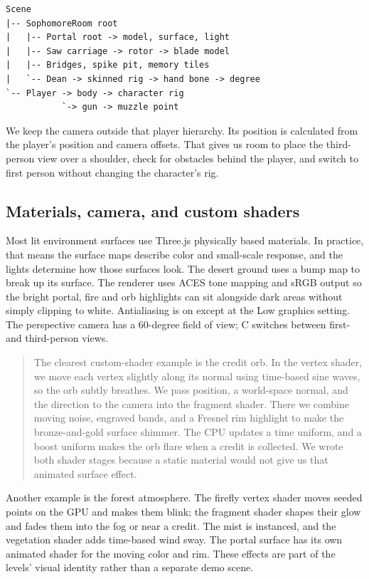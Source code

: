 \documentclass[11pt,a4paper]{article}
\newcommand{\say}[1]{\begin{quote}\small\color{ink}#1\end{quote}}
\begin{document}
\begin{verbatim}
Scene
|-- SophomoreRoom root
|   |-- Portal root -> model, surface, light
|   |-- Saw carriage -> rotor -> blade model
|   |-- Bridges, spike pit, memory tiles
|   `-- Dean -> skinned rig -> hand bone -> degree
`-- Player -> body -> character rig
           `-> gun -> muzzle point
\end{verbatim}

We keep the camera outside that player hierarchy. Its position is calculated from the player's position and camera offsets. That gives us room to place the third-person view over a shoulder, check for obstacles behind the player, and switch to first person without changing the character's rig.

\subsection{Materials, camera, and custom shaders}

Most lit environment surfaces use Three.js physically based materials. In practice, that means the surface maps describe color and small-scale response, and the lights determine how those surfaces look. The desert ground uses a bump map to break up its surface. The renderer uses ACES tone mapping and sRGB output so the bright portal, fire and orb highlights can sit alongside dark areas without simply clipping to white. Antialiasing is on except at the Low graphics setting. The perspective camera has a 60-degree field of view; C switches between first- and third-person views.

\say{The clearest custom-shader example is the credit orb. In the vertex shader, we move each vertex slightly along its normal using time-based sine waves, so the orb subtly breathes. We pass position, a world-space normal, and the direction to the camera into the fragment shader. There we combine moving noise, engraved bands, and a Fresnel rim highlight to make the bronze-and-gold surface shimmer. The CPU updates a time uniform, and a boost uniform makes the orb flare when a credit is collected. We wrote both shader stages because a static material would not give us that animated surface effect.}

Another example is the forest atmosphere. The firefly vertex shader moves seeded points on the GPU and makes them blink; the fragment shader shapes their glow and fades them into the fog or near a credit. The mist is instanced, and the vegetation shader adds time-based wind sway. The portal surface has its own animated shader for the moving color and rim. These effects are part of the levels' visual identity rather than a separate demo scene.
\end{document}
